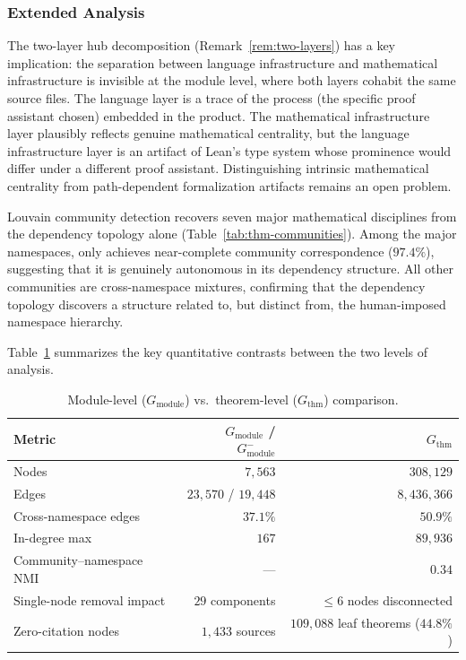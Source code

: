 \subsubsection{Extended Analysis}\label{app:decl-analysis}

The two-layer hub decomposition (Remark~\ref{rem:two-layers}) has a key implication: the separation between language infrastructure and mathematical infrastructure is invisible at the module level, where both layers cohabit the same source files. The language layer is a trace of the process (the specific proof assistant chosen) embedded in the product. The mathematical infrastructure layer plausibly reflects genuine mathematical centrality, but the language infrastructure layer is an artifact of Lean's type system whose prominence would differ under a different proof assistant. Distinguishing intrinsic mathematical centrality from path-dependent formalization artifacts remains an open problem.

Louvain community detection recovers seven major mathematical disciplines from the dependency topology alone (Table~\ref{tab:thm-communities}). Among the major namespaces, only  achieves near-complete community correspondence ($97.4\%$), suggesting that it is genuinely autonomous in its dependency structure. All other communities are cross-namespace mixtures, confirming that the dependency topology discovers a structure related to, but distinct from, the human-imposed namespace hierarchy.

\medskip

Table~\ref{tab:thm-vs-module} summarizes the key quantitative contrasts between the two levels of analysis.

\begin{table}[ht]
\centering
\caption{Module-level ($G_{\mathrm{module}}$) vs.\ theorem-level ($G_{\mathrm{thm}}$) comparison.}
\label{tab:thm-vs-module}
\begin{tabular}{lrr}
\toprule
Metric & $G_{\mathrm{module}}$ / $G_{\mathrm{module}}^{-}$ & $G_{\mathrm{thm}}$ \\
\midrule
Nodes                        & $7{,}563$          & $308{,}129$ \\
Edges                        & $23{,}570$ / $19{,}448$ & $8{,}436{,}366$ \\
Cross-namespace edges         & $37.1\%$           & $50.9\%$ \\
In-degree max                & $167$              & $89{,}936$ \\
Community--namespace NMI     & ---                & $0.34$ \\
Single-node removal impact   & $29$ components    & $\le 6$ nodes disconnected \\
Zero-citation nodes          & $1{,}433$ sources  & $109{,}088$ leaf theorems ($44.8\%$) \\
\bottomrule
\end{tabular}
\end{table}

